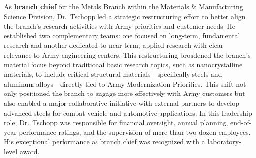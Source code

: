As \textbf{branch chief} for the Metals Branch within the Materials \& Manufacturing Science Division, Dr.~Tschopp led a strategic restructuring effort to better align the branch’s research activities with Army priorities and customer needs. He established two complementary teams: one focused on long-term, fundamental research and another dedicated to near-term, applied research with clear relevance to Army engineering centers. This restructuring broadened the branch's material focus beyond traditional basic research topics, such as nanocrystalline materials, to include critical structural materials---specifically steels and aluminum alloys---directly tied to Army Modernization Priorities. This shift not only positioned the branch to engage more effectively with Army customers but also enabled a major collaborative initiative with external partners to develop advanced steels for combat vehicle and automotive applications.  In this leadership role, Dr.~Tschopp was responsible for financial oversight, annual planning, end-of-year performance ratings, and the supervision of more than two dozen employees. His exceptional performance as branch chief was recognized with a laboratory-level award.

